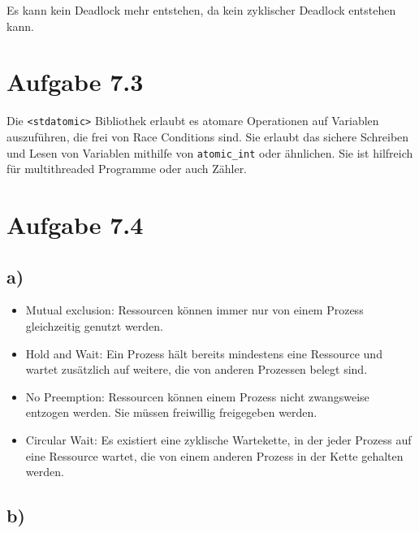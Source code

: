\documentclass[a4paper,12pt]{article}
\begin{document}
Es kann kein Deadlock mehr entstehen, da kein zyklischer Deadlock entstehen kann.


\section*{Aufgabe 7.3}

Die \texttt{<stdatomic>} Bibliothek erlaubt es atomare Operationen auf Variablen auszuführen, die frei von Race Conditions sind.
Sie erlaubt das sichere Schreiben und Lesen von Variablen mithilfe von \texttt{atomic\_int} oder ähnlichen. Sie ist 
hilfreich für multithreaded Programme oder auch Zähler.

\section*{Aufgabe 7.4}

\subsection*{a)}

\begin{itemize}
    \item Mutual exclusion: Ressourcen können immer nur von einem Prozess gleichzeitig genutzt werden.
    \item Hold and Wait: Ein Prozess hält bereits mindestens eine Ressource und wartet zusätzlich auf weitere, die von anderen Prozessen belegt sind.
    \item No Preemption: Ressourcen können einem Prozess nicht zwangsweise entzogen werden. Sie müssen freiwillig freigegeben werden.
    \item Circular Wait: Es existiert eine zyklische Wartekette, in der jeder Prozess auf eine Ressource wartet, die von einem anderen Prozess in der Kette gehalten werden.
\end{itemize}



\subsection*{b)}
\end{document}
